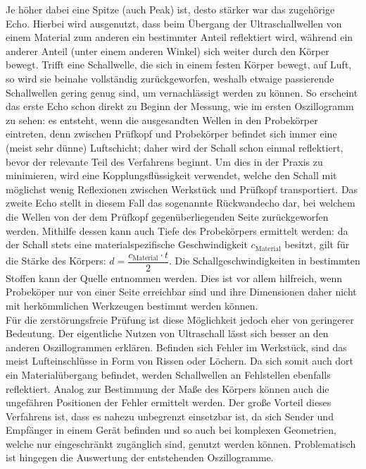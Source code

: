 \documentclass[reducespace,stylepage,semiarbeit]{spezidoc}
\begin{document}
Je höher dabei eine Spitze (auch Peak) ist, desto stärker war das zugehörige Echo. 
Hierbei wird ausgenutzt, dass beim Übergang der Ultraschallwellen von einem Material zum anderen ein bestimmter Anteil reflektiert wird, während ein anderer Anteil (unter einem anderen Winkel) sich weiter durch den Körper bewegt. 
Trifft eine Schallwelle, die sich in einem festen Körper bewegt, auf Luft, so wird sie beinahe vollständig zurückgeworfen, weshalb etwaige passierende Schallwellen gering genug sind, um vernachlässigt werden zu können. 
So erscheint das erste Echo schon direkt zu Beginn der Messung, wie im ersten Oszillogramm zu sehen: es entsteht, wenn die ausgesandten Wellen in den Probekörper eintreten, denn zwischen Prüfkopf und Probekörper befindet sich immer eine (meist sehr dünne) Luftschicht; daher wird der Schall schon einmal reflektiert, bevor der relevante Teil des Verfahrens beginnt. 
Um dies in der Praxis zu minimieren, wird eine Kopplungsflüssigkeit verwendet, welche den Schall mit möglichst wenig Reflexionen zwischen Werkstück und Prüfkopf transportiert. 
Das zweite Echo stellt in diesem Fall das sogenannte Rückwandecho dar, bei welchem die Wellen von der dem Prüfkopf gegenüberliegenden Seite zurückgeworfen werden. 
Mithilfe dessen kann auch Tiefe des Probekörpers ermittelt werden: da der Schall stets eine materialspezifische Geschwindigkeit $c_\mathrm{Material}$ besitzt, gilt für die Stärke des Körpers: $d = \dfrac{c_{\mathrm{Material}} \cdot t}{2}$. Die Schallgeschwindigkeiten in bestimmten Stoffen kann der Quelle \cite{schallgeschwindigkeiten} entnommen werden.
Dies ist vor allem hilfreich, wenn Probeköper nur von einer Seite erreichbar sind und ihre Dimensionen daher nicht mit herkömmlichen Werkzeugen bestimmt werden können.\\
Für die zerstörungsfreie Prüfung ist diese Möglichkeit jedoch eher von geringerer Bedeutung. 
Der eigentliche Nutzen von Ultraschall lässt sich besser an den anderen Oszillogrammen erklären. 
Befinden sich Fehler im Werkstück, sind das meist Lufteinschlüsse in Form von Rissen oder Löchern. 
Da sich somit auch dort ein Materialübergang befindet, werden Schallwellen an Fehlstellen ebenfalls reflektiert. 
Analog zur Bestimmung der Maße des Körpers können auch die ungefähren Positionen der Fehler ermittelt werden. 
Der große Vorteil dieses Verfahrens ist, dass es nahezu unbegrenzt einsetzbar ist, da sich Sender und Empfänger in einem Gerät befinden und so auch bei komplexen Geometrien, welche nur eingeschränkt zugänglich sind, genutzt werden können. 
Problematisch ist hingegen die Auswertung der entstehenden Oszillogramme. 
\end{document}
